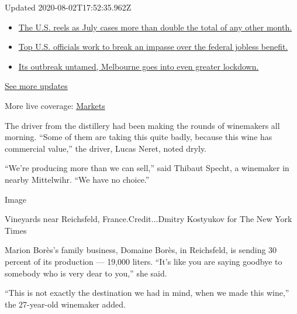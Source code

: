 Updated 2020-08-02T17:52:35.962Z

\begin{itemize}
\tightlist
\item
  \href{https://www.nytimes3xbfgragh.onion/2020/08/01/world/coronavirus-covid-19.html?action=click\&pgtype=Article\&state=default\&region=MAIN_CONTENT_1\&context=storylines_live_updates\#link-34047410}{The
  U.S. reels as July cases more than double the total of any other
  month.}
\item
  \href{https://www.nytimes3xbfgragh.onion/2020/08/01/world/coronavirus-covid-19.html?action=click\&pgtype=Article\&state=default\&region=MAIN_CONTENT_1\&context=storylines_live_updates\#link-780ec966}{Top
  U.S. officials work to break an impasse over the federal jobless
  benefit.}
\item
  \href{https://www.nytimes3xbfgragh.onion/2020/08/01/world/coronavirus-covid-19.html?action=click\&pgtype=Article\&state=default\&region=MAIN_CONTENT_1\&context=storylines_live_updates\#link-2bc8948}{Its
  outbreak untamed, Melbourne goes into even greater lockdown.}
\end{itemize}

\href{https://www.nytimes3xbfgragh.onion/2020/08/01/world/coronavirus-covid-19.html?action=click\&pgtype=Article\&state=default\&region=MAIN_CONTENT_1\&context=storylines_live_updates}{See
more updates}

More live coverage:
\href{https://www.nytimes3xbfgragh.onion/live/2020/07/31/business/stock-market-today-coronavirus?action=click\&pgtype=Article\&state=default\&region=MAIN_CONTENT_1\&context=storylines_live_updates}{Markets}

The driver from the distillery had been making the rounds of winemakers
all morning. ``Some of them are taking this quite badly, because this
wine has commercial value,'' the driver, Lucas Neret, noted dryly.

``We're producing more than we can sell,'' said Thibaut Specht, a
winemaker in nearby Mittelwihr. ``We have no choice.''

Image

Vineyards near Reichsfeld, France.Credit...Dmitry Kostyukov for The New
York Times

Marion Borès's family business, Domaine Borès, in Reichsfeld, is sending
30 percent of its production --- 19,000 liters. ``It's like you are
saying goodbye to somebody who is very dear to you,'' she said.

``This is not exactly the destination we had in mind, when we made this
wine,'' the 27-year-old winemaker added.


